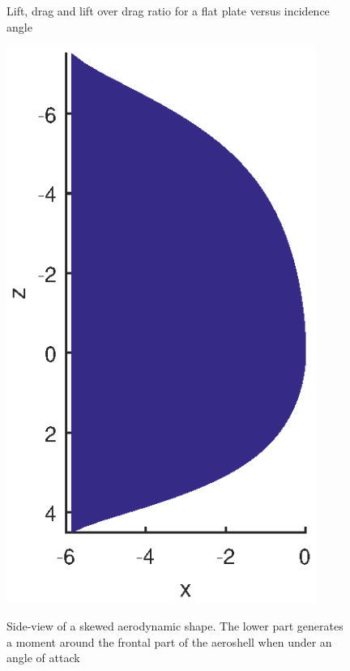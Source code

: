 \begin{figure}[h]
	\centering
	\begin{minipage}[b]{0.48\textwidth}
			\centering
		\setlength{} 
		\setlength{}
		
		\caption{Lift, drag and lift over drag ratio for a flat plate versus incidence angle}
	\end{minipage}

	\begin{minipage}[b]{0.48\textwidth} \label{fig:skewnessplot}
		\centering
		\includegraphics[width=0.9\textwidth]{./Figure/Aerodynamics/skewness.eps}
		\caption{Side-view of a skewed aerodynamic shape. The lower part generates a moment around the frontal part of the aeroshell when under an angle of attack}
	\end{minipage}
\end{figure}


